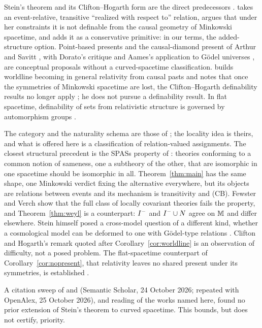 Stein's theorem and its Clifton--Hogarth form are the direct predecessors
\citep{Stein1968,Stein1991,CH1995}. \citet{Rakic1997} takes an event-relative,
transitive ``realized with respect to'' relation, argues that under her
constraints it is not definable from the causal geometry of Minkowski
spacetime, and adds it as a conservative primitive: in our terms, the
added-structure option. Point-based presents \citep{Muller2006}
and the causal-diamond present of Arthur and Savitt
\citep{Arthur2006,Arthur2019,Savitt2009,Savitt2015}, with Dorato's critique
\citep{Dorato2011} and Aames's application to Gödel universes \citep{Aames2022},
are conceptual proposals without a curved-spacetime classification.
\citet{Earman2008} builds worldline becoming in general relativity from causal
pasts and notes that once the symmetries of Minkowski spacetime are lost, the
Clifton--Hogarth definability results no longer apply \citep[p.~151]{Earman2008};
he does not pursue a definability result. In flat
spacetime, definability of sets from relativistic structure is governed by
automorphism groups \citep{MSS2025}.

The category and the naturality schema are those of \citet{BFV2003}; the
locality idea is theirs, and what is offered here is a classification of
relation-valued assignments. The closest structural precedent is the SPASs
property of \citet{FV2012}: theories conforming to a common notion of sameness,
one a subtheory of the other, that are isomorphic in one spacetime should be
isomorphic in all. Theorem~\ref{thm:main} has the same shape, one Minkowski verdict
fixing the alternative everywhere, but its objects are relations between events
and its mechanism is transitivity and (CB). Fewster and Verch show that the full
class of locally covariant theories fails the property, and
Theorem~\ref{thm:weyl} is a counterpart: $I^{-}$ and $I^{-}\cup N$ agree on
$\mathbb M$ and differ elsewhere. Stein himself posed a cross-model question of a
different kind, whether a cosmological model can be deformed to one with
Gödel-type relations \citep[p.~594]{Stein1970}. Clifton and Hogarth's remark
quoted after Corollary~\ref{cor:worldline} is an observation of difficulty, not a posed
problem. The flat-spacetime counterpart of Corollary~\ref{cor:nopresent}, that
relativity leaves no shared present under its symmetries, is established
\citep{Callender2000,Saunders2002}.

A citation sweep of
\citet{CH1995} and \citet{Stein1991} (Semantic Scholar, 24 October 2026; repeated
with OpenAlex, 25 October 2026), and
reading of the works named here, found no prior extension of
Stein's theorem to curved spacetime. This bounds, but does not certify,
priority.
